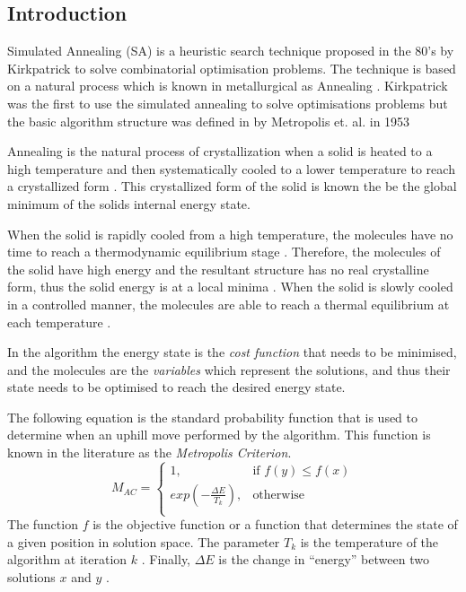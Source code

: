 \subsection{Introduction}
\label{sec:SAIntroduction}
Simulated Annealing (SA) is a heuristic search technique proposed in the 80's by Kirkpatrick to solve combinatorial optimisation problems. The technique is based on a natural process which is known in metallurgical as Annealing \cite{CurveFittingSA,SASingleMultiObj,TempCyclingSA,ChaosSA}. Kirkpatrick was the first to use the simulated annealing to solve optimisations problems but the basic algorithm structure was defined in by Metropolis et. al. in 1953 \cite{CurveFittingSA,VeryFastSAImageEnchancement}

Annealing is the natural process of crystallization when a solid is heated to a high temperature and then systematically cooled to a lower temperature to reach a crystallized form \cite{CurveFittingSA,NewSAs,MobileRobotSA,ConstantTempSA}. This crystallized form of the solid is known the be the global minimum of the solids internal energy state. 

When the solid is rapidly cooled from a high temperature, the molecules have no time to reach a thermodynamic equilibrium stage \cite{CurveFittingSA,NewSAs,MobileRobotSA,ConstantTempSA}. Therefore, the molecules of the solid have high energy and the resultant structure has no real crystalline form, thus the solid energy is at a local minima \cite{CurveFittingSA,NewSAs,MobileRobotSA}. When the solid is slowly cooled in a controlled manner, the molecules are able to reach a thermal equilibrium at each temperature \cite{ChaosSA,CurveFittingSA,NewSAs,MobileRobotSA,ConstantTempSA}.

In the algorithm the energy state is the \emph{cost function} that needs to be minimised, and the molecules are the \emph{variables} which represent the solutions, and thus their state needs to be optimised to reach the desired energy state.

The following equation is the standard probability function that is used to determine when an uphill move performed by the algorithm. This function is known in the literature as the \emph{Metropolis Criterion}. 
\begin{equation}
\label{eq:saprobability}
	M_{AC} =
	\begin{cases}
	1, &\text{if $f(y) \leq f(x)$}\\
	exp(-\frac{\Delta E}{T_k}), &\text{otherwise}\\
	\end{cases}
\end{equation}
The function $f$ is the objective function or a function that determines the state of a given position in solution space\cite{EcoEquilSA}. The parameter $T_k$ is the temperature of the algorithm at iteration $k$ \cite{EcoEquilSA}. Finally, $\Delta E$ is the change in ``energy'' between two solutions $x$ and $y$ \cite{EcoEquilSA}.

